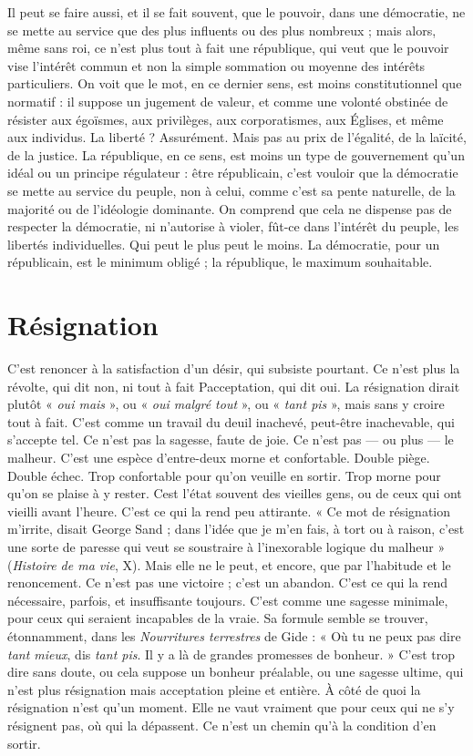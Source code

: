 Il peut se faire aussi, et il se fait souvent, que le pouvoir, dans une démocratie,
ne se mette au service que des plus influents ou des plus nombreux ;
mais alors, même sans roi, ce n’est plus tout à fait une république, qui veut que
le pouvoir vise l'intérêt commun et non la simple sommation ou moyenne des
intérêts particuliers. On voit que le mot, en ce dernier sens, est moins constitutionnel
que normatif : il suppose un jugement de valeur, et comme une volonté
obstinée de résister aux égoïsmes, aux privilèges, aux corporatismes, aux Églises,
et même aux individus. La liberté ? Assurément. Mais pas au prix de l'égalité,
de la laïcité, de la justice. La république, en ce sens, est moins un type de gouvernement
qu’un idéal ou un principe régulateur : être républicain, c’est vouloir
que la démocratie se mette au service du peuple, non à celui, comme c’est
sa pente naturelle, de la majorité ou de l'idéologie dominante. On comprend
que cela ne dispense pas de respecter la démocratie, ni n’autorise à violer, fût-ce
dans l’intérêt du peuple, les libertés individuelles. Qui peut le plus peut le
moins. La démocratie, pour un républicain, est le minimum obligé ; la république,
le maximum souhaitable.

\section{Résignation}
C’est renoncer à la satisfaction d’un désir, qui subsiste
pourtant. Ce n’est plus la révolte, qui dit non, ni tout à fait
Pacceptation, qui dit oui. La résignation dirait plutôt « {\it oui mais} », ou « {\it oui
malgré tout} », ou « {\it tant pis} », mais sans y croire tout à fait. C’est comme un travail
du deuil inachevé, peut-être inachevable, qui s’accepte tel. Ce n’est pas la
sagesse, faute de joie. Ce n’est pas — ou plus — le malheur. C’est une espèce
d’entre-deux morne et confortable. Double piège. Double échec. Trop confortable
pour qu’on veuille en sortir. Trop morne pour qu’on se plaise à y rester.
Cest l’état souvent des vieilles gens, ou de ceux qui ont vieilli avant l'heure.
C’est ce qui la rend peu attirante. « Ce mot de résignation m'irrite, disait
George Sand ; dans l’idée que je m’en fais, à tort ou à raison, c’est une sorte de
paresse qui veut se soustraire à l’inexorable logique du malheur » ({\it Histoire de
ma vie}, X). Mais elle ne le peut, et encore, que par l'habitude et le renoncement.
Ce n’est pas une victoire ; c’est un abandon. C’est ce qui la rend nécessaire,
parfois, et insuffisante toujours. C’est comme une sagesse minimale, pour
ceux qui seraient incapables de la vraie. Sa formule semble se trouver, étonnamment,
dans les {\it Nourritures terrestres} de Gide : « Où tu ne peux pas dire {\it tant
mieux}, dis {\it tant pis}. Il y a là de grandes promesses de bonheur. » C’est trop dire
sans doute, ou cela suppose un bonheur préalable, ou une sagesse ultime, qui
n’est plus résignation mais acceptation pleine et entière. À côté de quoi la résignation
n’est qu’un moment. Elle ne vaut vraiment que pour ceux qui ne s’y
résignent pas, où qui la dépassent. Ce n’est un chemin qu’à la condition d’en
sortir.

